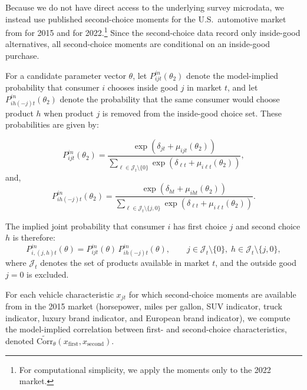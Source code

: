 \documentclass[11pt]{article}
\begin{document}
Because we do not have direct access to the underlying survey microdata, we instead use published second-choice moments for the U.S.\ automotive market from \cite{grieco_evolution_2024} for 2015 and \cite{allcott_effects_2024} for 2022.\footnote{For computational simplicity, we apply the \cite{allcott_effects_2024} moments only to the 2022 market.} Since the second-choice data record only inside-good alternatives, all second-choice moments are conditional on an inside-good purchase.

For a candidate parameter vector \(\theta\), let \(P_{ijt}^{in}(\theta_2)\) denote the model-implied probability that consumer \(i\) chooses inside good \(j\) in market \(t\), and let \(P_{ih(-j)t}^{in}(\theta_2)\) denote the probability that the same consumer would choose product \(h\) when product \(j\) is removed from the inside-good choice set. These probabilities are given by:

\begin{equation}
P_{ijt}^{in}(\theta_2)
=
\frac{\exp\!\left(\delta_{jt} + \mu_{ijt}(\theta_2)\right)}
{\sum_{\ell \in \mathcal{J}_t \setminus \{0\}}
\exp\!\left(\delta_{\ell t} + \mu_{i\ell t}(\theta_2)\right)},
\end{equation}
and,
\begin{equation}
P_{ih(-j)t}^{in}(\theta_2)
=
\frac{\exp\!\left(\delta_{ht} + \mu_{iht}(\theta_2)\right)}
{\sum_{\ell \in \mathcal{J}_t \setminus \{j,0\}}
\exp\!\left(\delta_{\ell t} + \mu_{i\ell t}(\theta_2)\right)}.
\end{equation}

The implied joint probability that consumer \(i\) has first choice \(j\) and second choice \(h\) is therefore:
\begin{equation}
P_{i,(j,h)t}^{in}(\theta)
=
P_{ijt}^{in}(\theta)\,
P_{ih(-j)t}^{in}(\theta),
\qquad
j \in \mathcal{J}_t \setminus \{0\},\;
h \in \mathcal{J}_t \setminus \{j,0\},
\end{equation}
where \(\mathcal{J}_t\) denotes the set of products available in market \(t\), and the outside good \(j=0\) is excluded.

For each vehicle characteristic \(x_{jt}\) for which second-choice moments are available from \cite{grieco_evolution_2024} in the 2015 market (horsepower, miles per gallon, SUV indicator, truck indicator, luxury brand indicator, and European brand indicator), we compute the model-implied correlation between first- and second-choice characteristics, denoted
\(\widetilde{\mathrm{Corr}}_{\theta}(x_{\text{first}}, x_{\text{second}})\).
\end{document}
